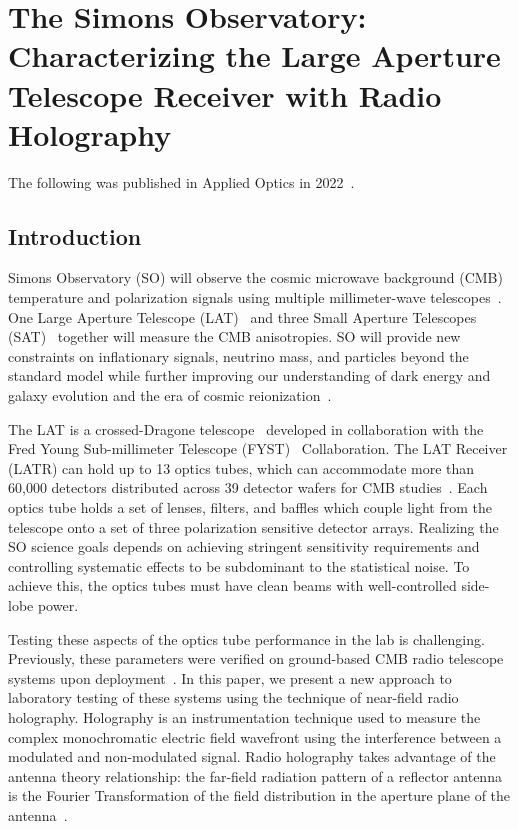 \chapter{The Simons Observatory: Characterizing the Large Aperture Telescope Receiver with Radio Holography}
\label{ch:ot_holo}
The following was published in Applied Optics in 2022~\cite{chesmore2022}.
\section{Introduction}

Simons Observatory (SO) will observe the cosmic microwave background (CMB) temperature and polarization signals using multiple millimeter-wave telescopes~\cite{gali18, so19}.  One Large Aperture Telescope (LAT)~\cite{Niemack:16, Gudmundsson:21,Parshley_2018} and three Small Aperture Telescopes (SAT)~\cite{ali20} together will measure the CMB anisotropies.  SO will provide new constraints on inflationary signals, neutrino mass, and particles beyond the standard model while further improving our understanding of dark energy and galaxy evolution and the era of cosmic reionization~\citep{so19}. 

The LAT is a crossed-Dragone telescope~\cite{6773968,Niemack:16,2021RNAAS...5..100X} developed in collaboration with the Fred Young Sub-millimeter Telescope (FYST)~\cite{ccat,aravena2019ccatprime} Collaboration.  The LAT Receiver (LATR) can hold up to 13 optics tubes, which can accommodate more than 60,000 detectors distributed across 39 detector wafers for CMB studies~\cite{Parshley_2018,zhu2021simons,mccarrick2021simons}.  Each optics tube holds a set of lenses, filters, and baffles which couple light from the telescope onto a set of three polarization sensitive detector arrays.   Realizing the SO science goals depends on achieving stringent sensitivity requirements and controlling systematic effects to be subdominant to the statistical noise.   To achieve this, the optics tubes must have clean beams with well-controlled side-lobe power.  

Testing these aspects of the optics tube performance in the lab is challenging.  Previously, these parameters were verified on ground-based CMB radio telescope systems upon deployment~\cite{alma_holog,2007A&A...465..679N}.  In this paper, we present a new approach to laboratory testing of these systems using the technique of near-field radio holography.  Holography is an instrumentation technique used to measure the complex monochromatic electric field wavefront using the interference between a modulated and non-modulated signal.  Radio holography takes advantage of the antenna theory relationship: the far-field radiation pattern of a reflector antenna is the Fourier Transformation of the field distribution in the aperture plane of the antenna~\cite{alma_holog}.

